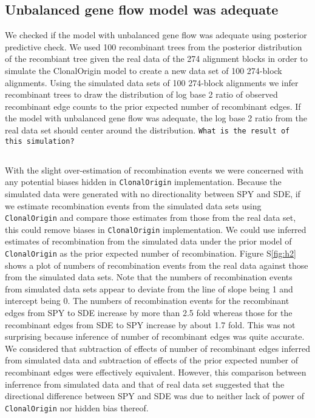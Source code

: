 \documentclass[english]{article}
\begin{document}
\subsection{Unbalanced gene flow model was adequate}

We checked if the model with unbalanced gene flow was adequate using posterior
predictive check. We used 100 recombinant trees from the posterior distribution
of the recombiant tree given the real data of the 274 alignment blocks in order
to simulate the ClonalOrigin model to create a new data set of 100 274-block
alignments.  Using the simulated data sets of 100 274-block alignments we
infer recombinant trees to draw the distribution of log base 2 ratio of
observed recombinant edge counts to the prior expected number of recombinant
edges. If the model with unbalanced gene flow was adequate, the log base 2
ratio from the real data set should center around the distribution. 
\texttt{What is the result of this simulation?}

\subsection{}

With the slight over-estimation of recombination events we were concerned with
any potential biases hidden in \texttt{ClonalOrigin} implementation. Because the
simulated data were generated with no directionality between SPY and SDE,  if we
estimate recombination events from the simulated data sets using
\texttt{ClonalOrigin} and compare those estimates from those from the real data
set, this could remove biases in \texttt{ClonalOrigin} implementation. We could
use inferred estimates of recombination from the simulated data under the prior
model of \texttt{ClonalOrigin} as the prior expected number of recombination.
Figure S\ref{fig:h2} shows a plot of numbers of recombination events from the
real data against those from the simulated data sets. Note that the numbers of
recombination events from simulated data sets appear to deviate from the line of
slope being 1 and intercept being 0.  The numbers of recombination events for
the recombinant edges from SPY to SDE increase by more than 2.5 fold whereas
those for the recombinant edges from SDE to SPY increase by about 1.7 fold.
This was not surprising because inference of number of recombinant edges was
quite accurate. We considered that subtraction of effects of number of
recombinant edges inferred from simulated data and subtraction of effects of the
prior expected number of recombinant edges were effectively equivalent.
However, this comparison between inferrence from simulated data and that of real
data set suggested that the directional difference between SPY and SDE was due
to neither lack of power of \texttt{ClonalOrigin} nor hidden bias thereof.
\end{document}
